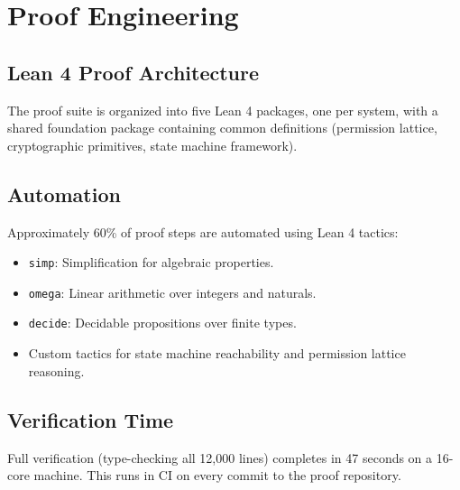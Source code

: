 \section{Proof Engineering}

\label{sec:engineering}

\subsection{Lean 4 Proof Architecture}

The proof suite is organized into five Lean 4 packages, one per system, with
a shared foundation package containing common definitions (permission lattice,
cryptographic primitives, state machine framework).

\subsection{Automation}

Approximately 60\% of proof steps are automated using Lean 4 tactics:
\begin{itemize}[leftmargin=1.1em]
    \item \texttt{simp}: Simplification for algebraic properties.
    \item \texttt{omega}: Linear arithmetic over integers and naturals.
    \item \texttt{decide}: Decidable propositions over finite types.
    \item Custom tactics for state machine reachability and permission
    lattice reasoning.
\end{itemize}

\subsection{Verification Time}

Full verification (type-checking all 12,000 lines) completes in 47 seconds on
a 16-core machine. This runs in CI on every commit to the proof repository.

